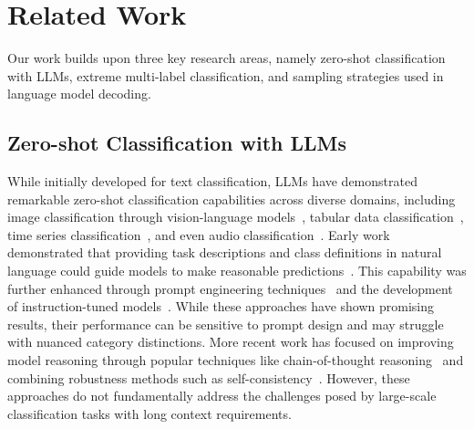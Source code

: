 \section{Related Work}
\label{sec:related_work}
Our work builds upon three key research areas, namely zero-shot classification with LLMs, extreme multi-label classification, and sampling strategies used in language model decoding.

\subsection{Zero-shot Classification with LLMs}
While initially developed for text classification, LLMs have demonstrated remarkable zero-shot classification capabilities across diverse domains, including image classification through vision-language models~\cite{radford2021learning,alayrac2022flamingo}, tabular data classification~\cite{hegselmann2023tabllm}, time series classification~\cite{zhang_large_2024}, and even audio classification~\cite{latif2023sparkslargeaudiomodels}. Early work demonstrated that providing task descriptions and class definitions in natural language could guide models to make reasonable predictions~\cite{kojima2022large,wei2022chain}. This capability was further enhanced through prompt engineering techniques~\cite{Sahoo2024ASS} and the development of instruction-tuned models~\cite{chung2022scaling}. While these approaches have shown promising results, their performance can be sensitive to prompt design and may struggle with nuanced category distinctions. More recent work has focused on improving model reasoning through popular techniques like chain-of-thought reasoning~\cite{wei2023chainofthoughtpromptingelicitsreasoning,kojima2023largelanguagemodelszeroshot} and combining robustness methods such as self-consistency~\cite{wang2023selfconsistencyimproveschainthought}. However, these approaches do not fundamentally address the challenges posed by large-scale classification tasks with long context requirements.

